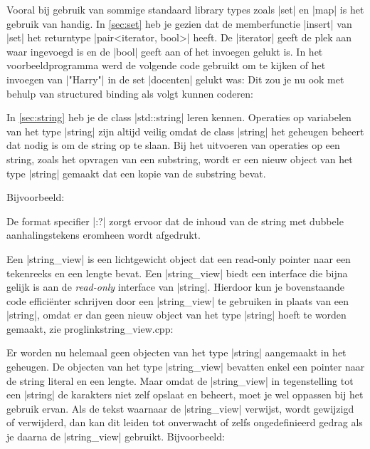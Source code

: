 \begin{cpplstShortInline}
Vooral bij gebruik van sommige standaard library types zoals |set| en |map| is het gebruik van  handig.
In \cref{sec:set} heb je gezien dat de memberfunctie |insert| van |set| het returntype  |pair<iterator, bool>| heeft.
De |iterator| geeft de plek aan waar ingevoegd is en de |bool| geeft aan of het invoegen gelukt is.
In het voorbeeldprogramma werd de volgende code gebruikt om te kijken of het invoegen van |"Harry"| in de set |docenten| gelukt was:
Dit zou je nu ook met behulp van structured binding als volgt kunnen coderen:

\label{sec:string_view}
In \cref{sec:string} heb je de class |std::string| leren kennen.
Operaties op variabelen van het type |string| zijn altijd veilig omdat de class |string| het geheugen beheert dat nodig is om de string op te slaan.
Bij het uitvoeren van operaties op een string, zoals het opvragen van een substring, wordt er een nieuw object van het type |string| gemaakt dat een kopie van de substring bevat.

Bijvoorbeeld:

De format specifier |:?| zorgt ervoor dat de inhoud van de string met dubbele aanhalingstekens eromheen wordt afgedrukt.

Een |string_view| is een lichtgewicht object dat een read-only pointer naar een tekenreeks en een lengte bevat.
Een |string_view| biedt een interface die bijna gelijk is aan de \emph{read-only} interface van |string|.
Hierdoor kun je bovenstaande code efficiënter schrijven door een |string_view| te gebruiken in plaats van een |string|, omdat er dan geen nieuw object van het type |string| hoeft te worden gemaakt, zie proglink{string\_view.cpp}:

Er worden nu helemaal geen objecten van het type |string| aangemaakt in het geheugen.
De objecten van het type |string_view| bevatten enkel een pointer naar de string literal en een lengte.
Maar omdat de |string_view| in tegenstelling tot een |string| de karakters niet zelf opslaat en beheert, moet je wel oppassen bij het gebruik ervan.
Als de tekst waarnaar de |string_view| verwijst, wordt gewijzigd of verwijderd, dan kan dit leiden tot onverwacht of zelfs ongedefinieerd gedrag als je daarna de |string_view| gebruikt.
Bijvoorbeeld:


\end{cpplstShortInline}
